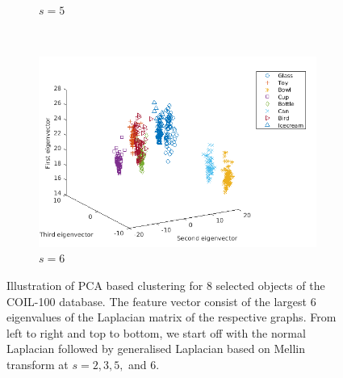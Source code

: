 \documentclass[10pt,a4paper]{article}
\begin{document}
\begin{figure}[H]
\begin{subfigure}[b]{0.5\textwidth}
		\caption{$s=5$}
		\label{}
	\end{subfigure}~
\begin{subfigure}[b]{0.5\textwidth}
	\includegraphics[width= \textwidth]{images/Mellin-s6.png}
	\caption{$s=6$}
	\label{}
\end{subfigure}
	\caption{Illustration of PCA based clustering for $8$ selected objects of the COIL-100 database. The feature vector consist of the largest $6$ eigenvalues of the Laplacian matrix of the respective graphs. From left to right and top to bottom, we start off with the normal Laplacian followed by generalised Laplacian based on Mellin transform at $s=2,3,5,$ and $6$. }
	\label{}
\end{figure}
\end{document}
